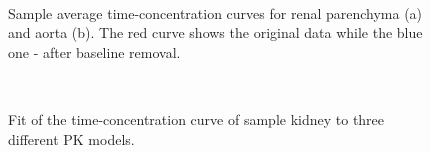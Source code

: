 \begin{figure}[h!]
	\centering
	\quad
	\\	
\caption{Sample average time-concentration curves for renal parenchyma (a) and aorta (b). The red curve shows the original data while the blue one - after baseline removal.}
\label{fig:removed_baseline}
\end{figure}

\begin{figure}[h!]
	\centering
	\quad
	\quad
	\\	
\caption{Fit of the time-concentration curve of sample kidney to three different PK models.}
\label{fig:models}
\end{figure}

\newpage

